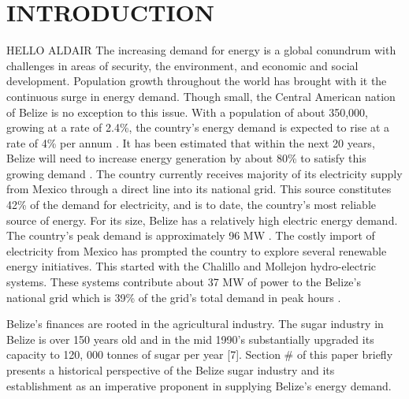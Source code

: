 \documentclass[twocolumn,10pt]{asme2e}
\begin{document}


\section*{INTRODUCTION}
HELLO ALDAIR
The increasing demand for energy is a global conundrum with challenges in areas of security, the environment, and economic and social development.\cite{asmemanual} Population growth throughout the world has brought with it the continuous surge in energy demand. Though small, the Central American nation of Belize is no exception to this issue. With a population of about 350,000, growing at a rate of 2.4\%, the country's energy demand is expected to rise at a rate of 4\% per annum \cite{sib_pop}. It has been estimated that within the next 20 years, Belize will need to increase energy generation by about 80\% to satisfy this growing demand \cite{idb_energy}. The country currently receives majority of its electricity supply from Mexico through a direct line into its national grid. This source constitutes 42\% of the demand for electricity, and is to date, the country's most reliable source of energy. For its size, Belize has a relatively high electric energy demand. The country's peak demand is approximately 96 MW \cite{bel_report}. The costly import of electricity from Mexico has prompted the country to explore several renewable energy initiatives. This started with the Chalillo and Mollejon hydro-electric systems. These systems contribute about 37 MW of power to the Belize's national grid which is 39\% of the grid's total demand in peak hours \cite{bel_eng_policy}.

Belize's finances are rooted in the agricultural industry. The sugar industry in Belize is over 150 years old and in the mid 1990's substantially upgraded its capacity to 120, 000 tonnes of sugar per year [7]. Section \# of this paper briefly presents a historical perspective of the Belize sugar industry and its establishment as an imperative proponent in supplying Belize's energy demand. 
\end{document}
